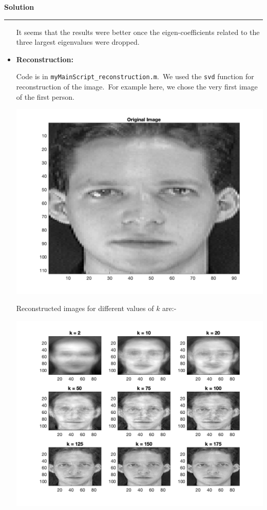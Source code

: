 \documentclass[a4paper,12pt]{article}
\newenvironment{solution}[2][]{%
    \begin{mdframed}[linecolor=blue!70!black, linewidth=2pt, roundcorner=10pt, backgroundcolor=yellow!10!white, skipabove=12pt, skipbelow=12pt]%
        \textbf{\large #2}
        \par\noindent\rule{\textwidth}{0.4pt}
}{
    \end{mdframed}
}
\begin{document}
\begin{solution}{Solution}
\begin{itemize}
		It seems that the results were better once the eigen-coefficients related to the three largest eigenvalues were dropped.

		\item \textbf{Reconstruction:}
		
		Code is in \texttt{myMainScript\_reconstruction.m}.\ We used the \texttt{svd} function for reconstruction of the image.\ For example here, we chose the very first image of the first person.

		\begin{center}
			\includegraphics[scale=0.21]{../images/original_image.png}
		\end{center}

		Reconstructed images for different values of $k$ are:-

		\begin{center}
			\includegraphics[width=0.9\linewidth]{../images/ORL_reconstructed_faces.png}
		\end{center}


\end{itemize}
\end{solution}
\end{document}

